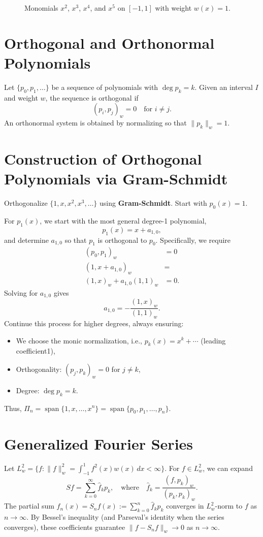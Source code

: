\begin{figure}[htbp!]
    \centering
    
    \caption{Monomials $x^2$, $x^3$, $x^4$, and $x^5$ on $[-1,1]$ with weight $w(x) = 1$.}
    \label{fig:monomials-plot}
\end{figure}
\section{Orthogonal and Orthonormal Polynomials}
\label{sec:orthogonal-polynomials}
Let $\{p_0, p_1, \ldots\}$ be a sequence of polynomials with $\deg p_k = k$. Given an interval $I$ and weight $w$, the sequence is orthogonal if
\[
    (p_i, p_j)_w = 0 \quad \text{for } i \neq j.
\]
An orthonormal system is obtained by normalizing so that $\|p_k\|_w = 1$.

\section{Construction of Orthogonal Polynomials via Gram-Schmidt}
Orthogonalize $\{1, x, x^2, x^3, \ldots\}$ using \textbf{Gram-Schmidt}. Start with $p_0(x) = 1$.

For $p_1(x)$, we start with the most general degree-1 polynomial,
\[
    p_1(x) = x + a_{1,0},
\]
and determine $a_{1,0}$ so that $p_1$ is orthogonal to $p_0$. Specifically, we require
\begin{align*}
    (p_0, p_1)_w               & = 0  \\
    (1, x + a_{1,0})_w         & =    \\
    (1, x)_w + a_{1,0}(1, 1)_w & = 0.
\end{align*}
Solving for $a_{1,0}$ gives
\[
    a_{1,0} = -\frac{(1, x)_w}{(1, 1)_w}.
\]
Continue this process for higher degrees, always ensuring:
\begin{itemize}
    \item We choose the monic normalization, i.e., $p_k(x)=x^k+\cdots$ (leading coefficient1),
    \item Orthogonality: $(p_j, p_k)_w = 0$ for $j \neq k$,
    \item Degree: $\deg p_k = k$.
\end{itemize}
Thus, $\Pi_n = \operatorname{span}\{1, x, \ldots, x^n\} = \operatorname{span}\{p_0, p_1, \ldots, p_n\}$.

\section{Generalized Fourier Series}
Let $L^2_w = \{f : \|f\|_w^2 = \int_{-1}^1 f^2(x)w(x)\,dx < \infty\}$. For $f \in L^2_w$, we can expand
\[
    S f = \sum_{k=0}^\infty \hat{f}_k p_k, \quad \text{where} \quad \hat{f}_k = \frac{(f, p_k)_w}{(p_k, p_k)_w}.
\]
The partial sum $f_n(x) = S_n f(x) := \sum_{k=0}^n \hat{f}_k p_k$ converges in $L^2_w$-norm to $f$ as $n \to \infty$. By Bessel's inequality (and Parseval's identity when the series converges), these coefficients guarantee $\|f - S_n f\|_w \to 0$ as $n\to\infty$.

